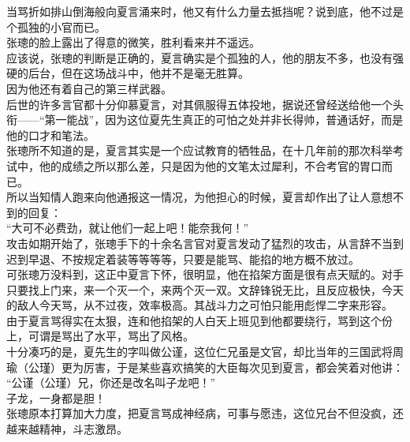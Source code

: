 \begin{multicols}{\theparacolNo}
当骂折如排山倒海般向夏言涌来时，他又有什么力量去抵挡呢？说到底，他不过是个孤独的小官而已。\\

张璁的脸上露出了得意的微笑，胜利看来并不遥远。\\

应该说，张璁的判断是正确的，夏言确实是个孤独的人，他的朋友不多，也没有强硬的后台，但在这场战斗中，他并不是毫无胜算。\\

因为他还有着自己的第三样武器。\\

后世的许多言官都十分仰慕夏言，对其佩服得五体投地，据说还曾经送给他一个头衔——“第一能战”，因为这位夏先生真正的可怕之处并非长得帅，普通话好，而是他的口才和笔法。\\

张璁所不知道的是，夏言其实是一个应试教育的牺牲品，在十几年前的那次科举考试中，他的成绩之所以那么差，只是因为他的文笔太过犀利，不合考官的胃口而已。\\

所以当知情人跑来向他通报这一情况，为他担心的时候，夏言却作出了让人意想不到的回复：\\

“大可不必费劲，就让他们一起上吧！能奈我何！”\\

攻击如期开始了，张璁手下的十余名言官对夏言发动了猛烈的攻击，从言辞不当到迟到早退、不按规定着装等等等等，只要是能骂、能掐的地方概不放过。\\

可张璁万没料到，这正中夏言下怀，很明显，他在掐架方面是很有点天赋的。对手只要找上门来，来一个灭一个，来两个灭一双。文辞锋锐无比，且反应极快，今天的敌人今天骂，从不过夜，效率极高。其战斗力之可怕只能用彪悍二字来形容。\\

由于夏言骂得实在太狠，连和他掐架的人白天上班见到他都要绕行，骂到这个份上，可谓是骂出了水平，骂出了风格。\\

十分凑巧的是，夏先生的字叫做公谨，这位仁兄虽是文官，却比当年的三国武将周瑜（公瑾）更为厉害，于是某些喜欢搞笑的大臣每次见到夏言，都会笑着对他讲：\\

“公谨（公瑾）兄，你还是改名叫子龙吧！”\\

子龙，一身都是胆！\\

张璁原本打算加大力度，把夏言骂成神经病，可事与愿违，这位兄台不但没疯，还越来越精神，斗志激昂。\\


\end{multicols}
